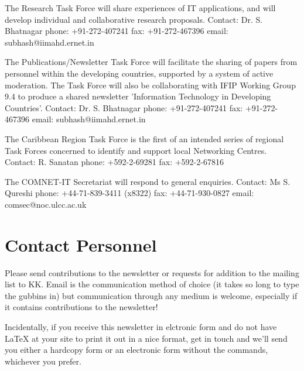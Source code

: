 	The Research Task Force will share experiences of IT applications,
and will develop individual and collaborative research proposals.
	Contact:			Dr. S. Bhatnagar
					phone: +91-272-407241
					fax:   +91-272-467396
					email: subhash@iimahd.ernet.in

	The Publications/Newsletter Task Force will facilitate the sharing of
papers from personnel within the developing countries, supported by a
system of active moderation.  The Task Force will also be collaborating with
IFIP Working Group 9.4 to produce a shared newsletter 'Information
Technology in Developing Countries'.
	Contact:			Dr. S. Bhatnagar
					phone: +91-272-407241
					fax:   +91-272-467396
					email: subhash@iimahd.ernet.in

	The Caribbean Region Task Force is the first of an intended series of
regional Task Forces concerned to identify and support local Networking
 Centres.
	Contact:			R. Sanatan
					phone: +592-2-69281
					fax:   +592-2-67816

	The COMNET-IT Secretariat will respond to general enquiries.
	Contact:			Ms S. Qureshi
					phone: +44-71-839-3411 (x8322)
					fax:   +44-71-930-0827
					email: comsec@noc.ulcc.ac.uk

\section{Contact Personnel}
Please send contributions to the newsletter or requests for addition
to the mailing list to KK. Email is the communication method of choice
(it takes so long to type the gubbins in) but communication through any
medium is welcome, especially if it contains contributions to the
newsletter!

Incidentally, if you receive this newsletter in elctronic form and do
not have LaTeX at your site to print it out in a nice format, get in
touch and we'll send you either a hardcopy form or an electronic form
without the commands, whichever you prefer.

